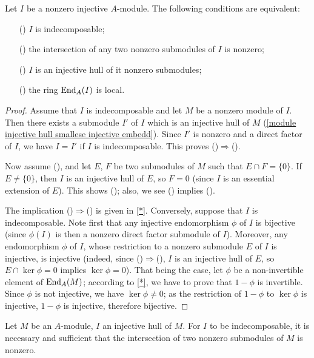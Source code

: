 \begin{proposition}\label{module injective indecomposable iff}
Let $I$ be a nonzero injective $A$-module. The following conditions are equivalent:
\begin{itemize}
\item[(\rmnum{1})] $I$ is indecomposable;
\item[(\rmnum{2})] the intersection of any two nonzero submodules of $I$ is nonzero;
\item[(\rmnum{3})] $I$ is an injective hull of it nonzero submodules;
\item[(\rmnum{4})] the ring $\mathrm{End}_A(I)$ is local.
\end{itemize}
\end{proposition}
\begin{proof}
Assume that $I$ is indecomposable and let $M$ be a nonzero module of $I$. Then there exists a submodule $I'$ of $I$ which is an injective hull of $M$ (\cref{module injective hull smallese injective embedd}). Since $I'$ is nonzero and a direct factor of $I$, we have $I=I'$ if $I$ is indecomposable. This proves ()$\Rightarrow$().\par
Now assume (), and let $E$, $F$ be two submodules of $M$ such that $E\cap F=\{0\}$. If $E\neq\{0\}$, then $I$ is an injective hull of $E$, so $F=0$ (since $I$ is an essential extension of $E$). This shows (); also, we see () implies ().\par
The implication ()$\Rightarrow$() is given in \cref{*}. Conversely, suppose that $I$ is indecomposable. Note first that any injective endomorphism $\phi$ of $I$ is bijective (since $\phi(I)$ is then a nonzero direct factor submodule of $I$). Moreover, any endomorphism $\phi$ of $I$, whose restriction to a nonzero submodule $E$ of $I$ is injective, is injective (indeed, since ()$\Rightarrow$(), $I$ is an injective hull of $E$, so $E\cap\ker\phi=0$ implies $\ker\phi=0$). That being the case, let $\phi$ be a non-invertible element of $\mathrm{End}_A(M)$; according to \cref{*}, we have to prove that $1-\phi$ is invertible. Since $\phi$ is not injective, we have $\ker\phi\neq 0$; as the restriction of $1-\phi$ to $\ker\phi$ is injective, $1-\phi$ is injective, therefore bijective.
\end{proof}
\begin{corollary}\label{module injective hull indecomposable iff}
Let $M$ be an $A$-module, $I$ an injective hull of $M$. For $I$ to be indecomposable, it is necessary and sufficient that the intersection of two nonzero submodules of $M$ is nonzero.
\end{corollary}
